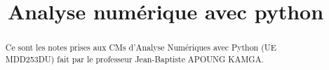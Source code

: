 \documentclass[a4paper]{report}
\title{Analyse numérique avec python}
\begin{document}
\maketitle
\begin{abstract}
   Ce sont les notes prises aux CMs d'Analyse Numériques avec Python (UE MDD253DU) fait par le professeur Jean-Baptiste APOUNG KAMGA.
\end{abstract}
\tableofcontents





\end{document}
